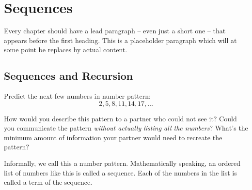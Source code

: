 \chapter{Sequences}
\label{ch:sequences}



Every chapter should have a lead paragraph -- even just a short one -- that appears before the first heading. This is a placeholder paragraph which will at some point be replaces by actual content.

\newif\iffractals
\fractalstrue

\section{Sequences and Recursion}
\label{sec:recursion}

\begin{boxedexplore}
Predict the next few numbers in number pattern: \[2, 5, 8, 11, 14, 17, \dotsc\]

How would you describe this pattern to a partner who could not see it? Could you communicate the pattern \textit{without actually listing all the numbers}? What's the minimum amount of information your partner would need to recreate the pattern?
\end{boxedexplore}

Informally, we call this a number pattern. Mathematically speaking, an ordered list of numbers like this is called a \gls{sequence}. Each of the numbers in the list is called a \gls{term} of the sequence.



